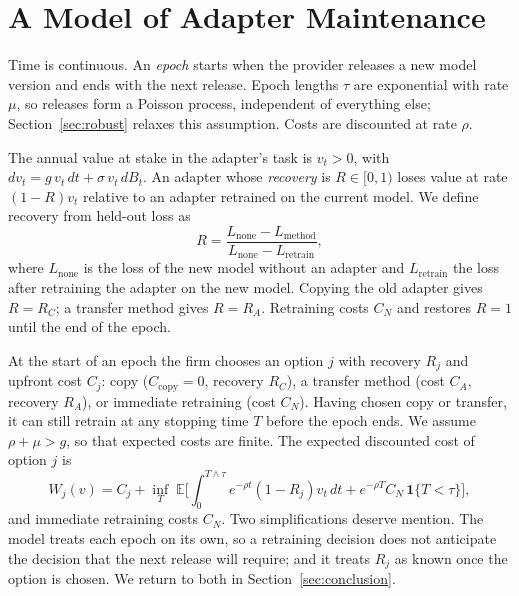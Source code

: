\documentclass[preprint,12pt,authoryear]{elsarticle}
\newcommand{\E}{\mathbb{E}}
\begin{document}
\section{A Model of Adapter Maintenance}\label{sec:model}

Time is continuous. An \emph{epoch} starts when the provider releases a new model version and ends with the next release. Epoch lengths $\tau$ are exponential with rate $\mu$, so releases form a Poisson process, independent of everything else; Section~\ref{sec:robust} relaxes this assumption. Costs are discounted at rate $\rho$.

The annual value at stake in the adapter's task is $v_t>0$, with $dv_t=g\,v_t\,dt+\sigma\,v_t\,dB_t$. An adapter whose \emph{recovery} is $R\in[0,1)$ loses value at rate $(1-R)v_t$ relative to an adapter retrained on the current model. We define recovery from held-out loss as
\begin{equation}\label{eq:recovery}
R=\frac{L_{\text{none}}-L_{\text{method}}}{L_{\text{none}}-L_{\text{retrain}}},
\end{equation}
where $L_{\text{none}}$ is the loss of the new model without an adapter and $L_{\text{retrain}}$ the loss after retraining the adapter on the new model. Copying the old adapter gives $R=R_C$; a transfer method gives $R=R_A$. Retraining costs $C_N$ and restores $R=1$ until the end of the epoch.

At the start of an epoch the firm chooses an option $j$ with recovery $R_j$ and upfront cost $C_j$: copy ($C_{\text{copy}}=0$, recovery $R_C$), a transfer method (cost $C_A$, recovery $R_A$), or immediate retraining (cost $C_N$). Having chosen copy or transfer, it can still retrain at any stopping time $T$ before the epoch ends. We assume $\rho+\mu>g$, so that expected costs are finite. The expected discounted cost of option $j$ is
\begin{equation}\label{eq:W}
W_j(v)=C_j+\inf_{T}\;\E\Big[\int_0^{T\wedge\tau}e^{-\rho t}(1-R_j)v_t\,dt+e^{-\rho T}C_N\,\mathbf 1\{T<\tau\}\Big],
\end{equation}
and immediate retraining costs $C_N$. Two simplifications deserve mention. The model treats each epoch on its own, so a retraining decision does not anticipate the decision that the next release will require; and it treats $R_j$ as known once the option is chosen. We return to both in Section~\ref{sec:conclusion}.
\end{document}
